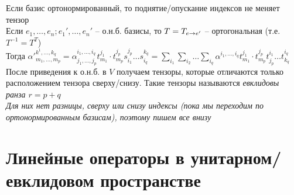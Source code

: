 \documentclass[12pt]{article}
\begin{document}
Если базис ортонормированный, то поднятие/опускание индексов не меняет тензор\\
Если $e_1, \ldots, e_n; e_1', \ldots, e_n'$ -- о.н.б. базисы, то $T = T_{e\rightarrow e'}$ -- ортогональная (т.е. $T^{-1} = T^T$)\\
Тогда $\alpha'^{k^1, \ldots, k_q}_{m_1,\ldots, m_p} = \alpha_{j_1, \ldots, j_p}^{i_1, \ldots, i_q} t^{j_1}_{m_1}\cdot t_{m_p}^{j_p} s_{i_1}^{j_p} \ldots s_{i_q}^{k_q} = \sum_{i_1}\sum_{i_2}\ldots\sum_{i_q} \alpha^{i_1,\ldots, i_q} t^{j_1}_{m_1}\cdot t_{m_p}^{j_p} t^{i_1}_{j_p} \ldots t^{i_q}_{k_q}$\\
После приведения к о.н.б. в $V$ получаем тензоры, которые отличаются только расположением тензора сверху/снизу. Такие тензоры называются \it{евклидовы} ранза $r=p+q$\\
Для них нет разницы, сверху или снизу индексы (пока мы переходим по ортонормированным базисам), поэтому пишем все внизу
\section{Линейные операторы в унитарном/евклидовом пространстве}
\end{document}
